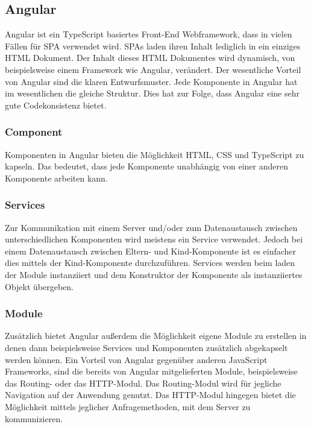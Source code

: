 \documentclass[paper=a4,fontsize=12pt,parskip=half]{scrartcl}
\begin{document}
	\subsection{Angular}
	\label{sec: angular}
	Angular ist ein TypeScript basiertes Front-End Webframework, dass in vielen Fällen für \gls{SPA} verwendet wird. \gls{SPA}s laden ihren Inhalt lediglich in ein einziges \gls{HTML} Dokument. Der Inhalt dieses \gls{HTML} Dokumentes wird dynamisch, von beispielsweise einem Framework wie Angular, verändert. Der wesentliche Vorteil von Angular sind die klaren Entwurfsmuster. Jede Komponente in Angular hat im wesentlichen die gleiche Struktur. Dies hat zur Folge, dass Angular eine sehr gute Codekonsistenz bietet.
	
	
	\subsubsection{Component}
	\label{sec: ang-component}
	Komponenten in Angular bieten die Möglichkeit \gls{HTML}, \gls{CSS} und TypeScript zu kapseln. Das bedeutet, dass jede Komponente unabhängig von einer anderen Komponente arbeiten kann.
	
	\subsubsection{Services}
	\label{sec: ang-service}
	Zur Kommunikation mit einem Server und/oder zum Datenaustausch zwischen unterschiedlichen Komponenten wird meistens ein Service verwendet. Jedoch bei einem Datenaustausch zwischen Eltern- und Kind-Komponente ist es einfacher dies mittels der Kind-Komponente durchzuführen. Services werden beim laden der Module instanziiert und dem Konstruktor der Komponente als instanziiertes Objekt übergeben.
	
	\subsubsection{Module}
	\label{sec: ang-modul}
	Zusätzlich bietet Angular außerdem die Möglichkeit eigene Module zu erstellen in denen dann beispielsweise Services und Komponenten zusätzlich abgekapselt werden können. Ein Vorteil von Angular gegenüber anderen JavaScript Frameworks, sind die bereits von Angular mitgelieferten Module, beispielsweise das Routing- oder das HTTP-Modul. Das Routing-Modul wird für jegliche Navigation auf der Anwendung genutzt. Das \gls{HTTP}-Modul hingegen bietet die Möglichkeit mittels jeglicher Anfragemethoden, mit dem Server zu kommunizieren.
	
\end{document}
